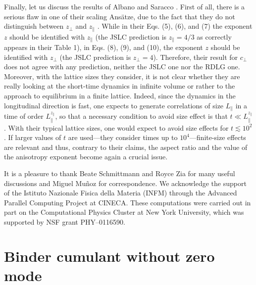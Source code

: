 \documentclass[12pt]{article}
\begin{document}
Finally, let us discuss \cite{CGGP-commento} the results
of Albano and Saracco \cite{AS-02}. 
First of all, there is a serious flaw in one of their scaling Ans\"atze,
due to the fact that they do not distinguish between $z_\bot$ and $z_\|$
\cite{Schmittmann95}. While in their Eqs. (5), (6), and (7) the exponent
$z$ should be identified with $z_\|$ (the JSLC prediction is $z_\| = 4/3$
as correctly appears in their Table 1), in Eqs. (8), (9), and (10), 
the exponent $z$ should be identified with $z_\bot$ 
(the JSLC prediction is $z_\bot = 4$). Therefore, their result for 
$c_\perp$ does not agree with any 
prediction, neither the JSLC one nor the RDLG one. 
Moreover, with the lattice sizes they
consider, it is not clear whether they are really looking at the short-time 
dynamics  in infinite volume or rather to the approach to equilibrium 
in a finite lattice. Indeed, since the dynamics in the longitudinal direction
is fast, one expects to generate correlations of size $L_\|$ in a time of 
order $L_\|^{z_\|}$, so that a necessary condition to avoid size effect is 
that $t \ll L_\|^{z_\|}$. With their typical lattice sizes, one would expect to 
avoid size effects for $t \lesssim 10^2$. If larger values of $t$ are 
used---they consider times up to $10^4$---finite-size effects are 
relevant and thus, contrary to their claims, the aspect ratio and the 
value of the anisotropy exponent become again a crucial issue. 


\bigskip\bigskip

It is a pleasure to thank Beate Schmittmann and Royce Zia for many 
useful discussions 
and Miguel Mu\~noz  for correspondence. We acknowledge the
support of the Istituto Nazionale Fisica della Materia (INFM) through 
the Advanced Parallel Computing Project at
CINECA. These computations were carried out in part on the Computational
Physics Cluster at New York University, which was supported by NSF grant
PHY--0116590.


\newcommand{\f}{\ensuremath \varphi}
\def\bsigma{\mbox{\protect\boldmath $\sigma$}}
\def\bmu{\mbox{\protect\boldmath $\mu$}}
\newcommand{\zm}{\mbox{{\sc zm}}}
\newcommand{\nzm}{\mbox{{\sc zm}\!\!\!\!\!\textbackslash\!\!\!\slash}\,\,}
\newcommand{\dd}{{\rm d}}


\appendix

\section{Binder cumulant without zero mode} \label{AppA}
\end{document}
